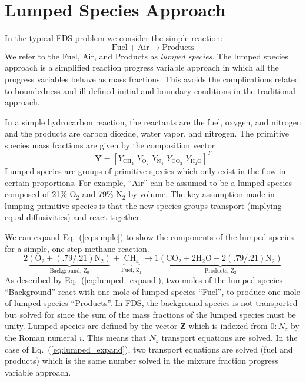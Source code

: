 \section{Lumped Species Approach}
In the typical FDS problem we consider the simple reaction:
\begin{equation}\label{eq:simple}
\mathrm{Fuel + Air \rightarrow Products}
\end{equation}
We refer to the Fuel, Air, and Products as \emph{lumped species}.  The lumped species approach is a simplified reaction progress variable approach \cite{fox2003} in which all the progress variables behave as mass fractions. This avoids the complications related to boundedness and ill-defined initial and boundary conditions in the traditional approach.

In a simple hydrocarbon reaction, the reactants are the fuel, oxygen, and nitrogen and the products are carbon dioxide, water vapor, and nitrogen. The primitive species mass fractions are given by the composition vector
\begin{equation}\label{eq:prim_vector}
\mathbf{Y} = [Y_{\mathrm{CH}_4}\, \, Y_{\mathrm{O}_2}\, \, Y_{\mathrm{N}_4}\, \, Y_{\mathrm{CO}_2}\, \, Y_{\mathrm{H}_2\mathrm{O}}]^T
\end{equation}
Lumped species are groups of primitive species which only exist in the flow in certain proportions. For example, ``Air'' can be assumed to be a lumped species composed of 21\% O$_2$ and 79\% N$_2$ by volume. The key assumption made in lumping primitive species is that the new species groups transport (implying equal diffusivities) and react together. 

We can expand Eq.~(\ref{eq:simple}) to show the components of the lumped species for a simple, one-step methane reaction. 
\begin{equation}\label{eq:lumped_expand}
\mathrm{2\underbrace{(\mbox{O}_2+(.79/.21)\mbox{N}_2)}_\text{Background,~$Z_0$}+\underbrace{\mbox{CH}_4}_\text{Fuel,~$Z_1$} \rightarrow 1\underbrace{(\mbox{CO}_2+2\mbox{H}_2\mbox{O}+2(.79/.21)\mbox{N}_2)}_\text{Products,~$Z_2$}}
\end{equation}
As described by Eq.~(\ref{eq:lumped_expand}), two moles of the lumped species ``Background'' react with one mole of lumped species ``Fuel'', to produce one mole of lumped species ``Products''. In FDS, the background species is not transported but solved for since the sum of the mass fractions of the lumped species must be unity. Lumped species are defined by the vector $\textbf{Z}$ which is indexed from $0:N_{z}$ by the Roman numeral $i$. This means that $N_{z}$ transport equations are solved. In the case of Eq.~(\ref{eq:lumped_expand}), two transport equations are solved (fuel and products) which is the same number solved in the mixture fraction progress variable approach.

